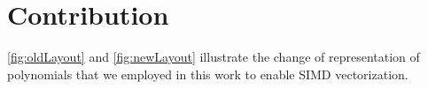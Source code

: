 \section{Contribution}

\figOldLayout
\figNewLayout

\autoref{fig:oldLayout} and \autoref{fig:newLayout} illustrate the change of
representation of polynomials that we employed in this work to enable SIMD
vectorization.


